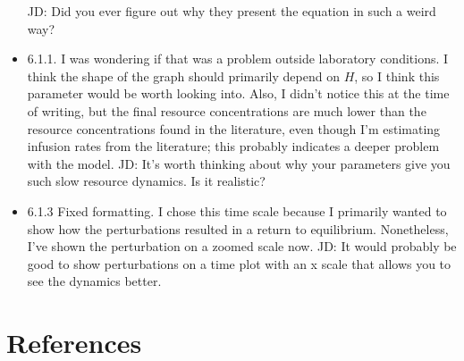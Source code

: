 \documentclass{article}
\begin{document}
\begin{itemize}
        \subitem JD: Did you ever figure out why they present the equation in such a weird way?
    \item 6.1.1. I was wondering if that was a problem outside laboratory conditions. I think the shape of the graph should primarily depend on $H$, so I think this parameter would be worth looking into. Also, I didn't notice this at the time of writing, but the final resource concentrations are much lower than the resource concentrations found in the literature, even though I'm estimating infusion rates from the literature; this probably indicates a deeper problem with the model.
        \subitem JD: It's worth thinking about why your parameters give you such slow resource dynamics. Is it realistic?
    \item 6.1.3 Fixed formatting. I chose this time scale because I primarily wanted to show how the perturbations resulted in a return to equilibrium. Nonetheless, I've shown the perturbation on a zoomed scale now.
        \subitem JD: It would probably be good to show perturbations on a time plot with an x scale that allows you to see the dynamics better. 
\end{itemize}
 
\section{References}
\end{document}
